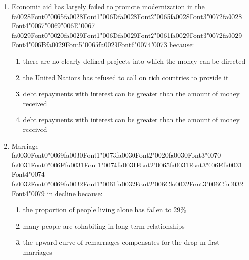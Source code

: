 \documentclass[12pt]{article}
\begin{document}
\begin{enumerate}[label=\arabic*.]
\begin{enumerate}[label=(\alph*)]
    \item impersonal rules
    \item extensive paperwork
    \item hierarchy of officials
    \item Salaries
\end{enumerate}
\item Economic aid has largely failed to promote modernization in the {\csname fa0028Font0\endcsname\char"0065}{\csname fa0028Font1\endcsname\char"006D}{\csname fa0028Font2\endcsname\char"0065}{\csname fa0028Font3\endcsname\char"0072}{\csname fa0028Font4\endcsname\char"0067}{\char"0069}{\char"006E}{\char"0067} {\csname fa0029Font0\endcsname\char"0020}{\csname fa0029Font1\endcsname\char"006D}{\csname fa0029Font2\endcsname\char"0061}{\csname fa0029Font3\endcsname\char"0072}{\csname fa0029Font4\endcsname\char"006B}{\csname fa0029Font5\endcsname\char"0065}{\csname fa0029Font6\endcsname\char"0074}{\char"0073} because:
\begin{enumerate}[label=(\alph*)]
    \item there are no clearly defined projects into which the money can be directed
    \item the United Nations has refused to call on rich countries to provide it
    \item debt repayments with interest can be greater than the amount of money received
    \item debt repayments with interest can be greater than the amount of money received
\end{enumerate}
\item Marriage {\csname fa0030Font0\endcsname\char"0069}{\csname fa0030Font1\endcsname\char"0073}{\csname fa0030Font2\endcsname\char"0020}{\csname fa0030Font3\endcsname\char"0070} {\csname fa0031Font0\endcsname\char"006F}{\csname fa0031Font1\endcsname\char"0074}{\csname fa0031Font2\endcsname\char"0065}{\csname fa0031Font3\endcsname\char"006E}{\csname fa0031Font4\endcsname\char"0074} {\csname fa0032Font0\endcsname\char"0069}{\csname fa0032Font1\endcsname\char"0061}{\csname fa0032Font2\endcsname\char"006C}{\csname fa0032Font3\endcsname\char"006C}{\csname fa0032Font4\endcsname\char"0079} in decline because:
\begin{enumerate}[label=(\alph*)]
    \item the proportion of people living alone has fallen to 29\%
    \item many people are cohabiting in long term relationships
    \item the upward curve of remarriages compensates for the drop in first marriages

\end{enumerate}
\end{enumerate}
\end{document}
